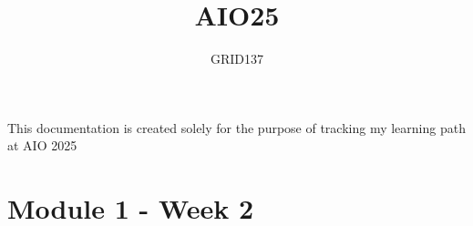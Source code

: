 \documentclass[12pt]{report}
\title{AIO25}
\author{GRID137}
\begin{document}
	
	\maketitle
	
	\begin{center}
		\large This documentation is created solely for the purpose of tracking my learning path at AIO 2025
	\end{center}
	
	\tableofcontents
	\listoffigures
	\listoftables
	\newpage
	
	\chapter{Module 1 - Week 2}
	
	
	
	
\end{document}

